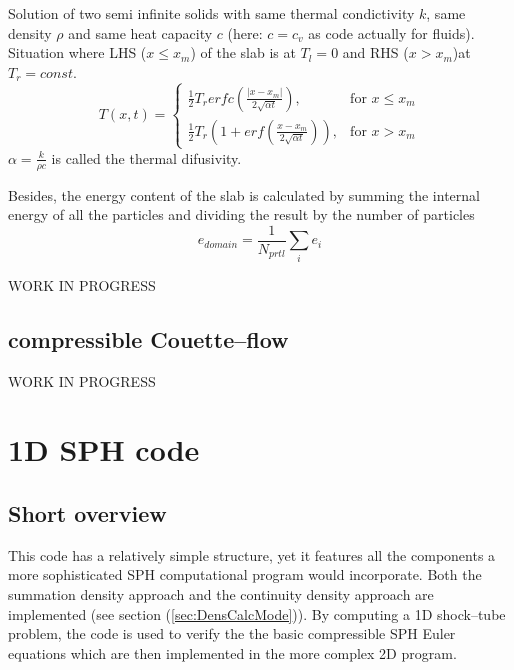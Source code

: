 \documentclass{report}
\begin{document}
Solution of two semi infinite solids with same thermal condictivity $k$, same density $\rho$ and same heat capacity $c$ (here: $c=c_v$ as code actually for fluids). Situation where LHS ($x \leq x_m$) of the slab is at $T_l=0$ and RHS ($x > x_m$)at $T_r=const.$ \cite{Carslaw1959}
\begin{equation}
 T(x,t)=\begin{cases}
\frac{1}{2} T_r erfc\left(\frac{|x-x_m|}{2\sqrt{\alpha t}}\right),& \text{for  $x\leq x_m$} \\
\frac{1}{2} T_r\left(1+erf\left(\frac{x-x_m}{2\sqrt{\alpha t}}\right)\right),& \text{for  $x> x_m$}
\end{cases}
\end{equation}
$\alpha=\frac{k}{\rho c}$ is called the thermal difusivity. 

Besides, the energy content of the slab is calculated by summing the internal energy of all the particles and dividing the result by the number of particles
\begin{equation}
 \label{eq:energyContent}
e_{\mathit{domain}}=\frac{1}{N_{\mathit{prtl}}}\sum_i e_i
\end{equation}


WORK IN PROGRESS 

\subsection{compressible Couette--flow}

WORK IN PROGRESS

\section{1D SPH code}
\label{sec:1DSPHcode}

\subsection{Short overview}

This code has a relatively simple structure, yet it features all the components
a more sophisticated SPH computational program would incorporate. Both the summation 
density approach and the continuity density approach are implemented (see section (\ref{sec:DensCalcMode})). By computing a 1D shock--tube problem, the code is used to verify the the basic compressible SPH Euler equations which are then implemented in the more complex 2D program.
 
\end{document}
